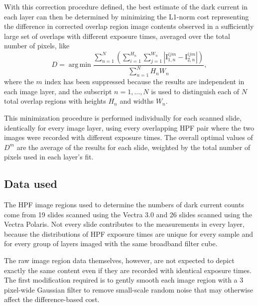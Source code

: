 \documentclass[letterpaper,11pt]{article}
\DeclareMathOperator*{\argmin}{arg\,min}
\newcommand{\Iota}{\mathrm{I}}
\begin{document}
With this correction procedure defined, the best estimate of the dark current in each layer can then be determined by minimizing the L1-norm cost representing the difference in corrected overlap region image contents observed in a sufficiently large set of overlaps with different exposure times, averaged over the total number of pixels, like
\begin{equation}
D = \argmin{ \frac{ \sum_{n=1}^{N} \left( \sum_{i=1}^{H_{n}} \sum_{j=1}^{W_{n}} \left| \Iota^{ijm}_{1,n} - \Iota^{ijm}_{2,n} \right| \right) }{ \sum_{n=1}^{N} H_{n}W_{n}} },
\end{equation} 
where the $m$ index has been suppressed because the results are independent in each image layer, and the subscript $n=1,\ldots,N$ is used to distinguish each of $N$ total overlap regions with heights $H_{n}$ and widths $W_{n}$. 

This minimization procedure is performed individually for each scanned slide, identically for every image layer, using every overlapping HPF pair where the two images were recorded with different exposure times. The overall optimal values of $D^{m}$ are the average of the results for each slide, weighted by the total number of pixels used in each layer's fit.  

\subsection{Data used}
\label{ssec:data_used}

The HPF image regions used to determine the numbers of dark current counts come from 19 slides scanned using the Vectra 3.0 and 26 slides scanned using the Vectra Polaris. Not every slide contributes to the measurements in every layer, because the distributions of HPF exposure times are unique for every sample and for every group of layers imaged with the same broadband filter cube. 

The raw image region data themselves, however, are not expected to depict exactly the same content even if they are recorded with identical exposure times. The first modification required is to gently smooth each image region with a 3 pixel-wide Gaussian filter to remove small-scale random noise that may otherwise affect the difference-based cost. 
\end{document}
